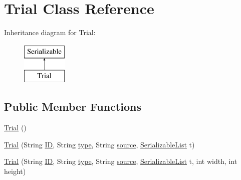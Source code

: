 \hypertarget{classdata_1_1_trial}{}\section{Trial Class Reference}
\label{classdata_1_1_trial}
Inheritance diagram for Trial\+:\begin{figure}[H]
\begin{center}
\leavevmode
\includegraphics[height=2.000000cm]{classdata_1_1_trial}
\end{center}
\end{figure}
\subsection*{Public Member Functions}
\begin{DoxyCompactItemize}
\item 
\hyperlink{classdata_1_1_trial_a51be9587f5b14a496bb780bccbccaee8}{Trial} ()
\item 
\hyperlink{classdata_1_1_trial_a126387998f2a727e3a4db2c72293e4d7}{Trial} (String \hyperlink{classdata_1_1_trial_a317298c3409575f71e43acd3f73ce295}{ID}, String \hyperlink{classdata_1_1_trial_a0b86e44425dbe3c9d866aa273f87828a}{type}, String \hyperlink{classdata_1_1_trial_a00baeba9d13a88ce01098a02d1e570d5}{source}, \hyperlink{classdata_1_1_serializable_list}{Serializable\+List} t)
\item 
\hyperlink{classdata_1_1_trial_a72ffe1cbd8147a3750b90abef38d8050}{Trial} (String \hyperlink{classdata_1_1_trial_a317298c3409575f71e43acd3f73ce295}{ID}, String \hyperlink{classdata_1_1_trial_a0b86e44425dbe3c9d866aa273f87828a}{type}, String \hyperlink{classdata_1_1_trial_a00baeba9d13a88ce01098a02d1e570d5}{source}, \hyperlink{classdata_1_1_serializable_list}{Serializable\+List} t, int width, int height)
\end{DoxyCompactItemize}
